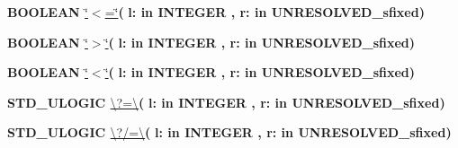 \begin{DoxyCompactItemize}
\item 
{\bfseries {\bfseries \textcolor{comment}{B\+O\+O\+L\+E\+A\+N}\textcolor{vhdlchar}{ }}} \hyperlink{class__fixed__pkg_a65b73a94d4fe541a941f431175b342b7}{\char`\"{}$<$=\char`\"{}}{\bfseries  ( }{\bfseries \textcolor{vhdlchar}{l\+: }\textcolor{stringliteral}{in }{\bfseries \textcolor{comment}{I\+N\+T\+E\+G\+E\+R}\textcolor{vhdlchar}{ }}}{\bfseries  , \textcolor{vhdlchar}{r\+: }\textcolor{stringliteral}{in }\textcolor{vhdlchar}{U\+N\+R\+E\+S\+O\+L\+V\+E\+D\+\_\+sfixed}}{\bfseries  )} 
\item 
{\bfseries {\bfseries \textcolor{comment}{B\+O\+O\+L\+E\+A\+N}\textcolor{vhdlchar}{ }}} \hyperlink{class__fixed__pkg_ac6c82329bf849852be997a3d0a737cf9}{\char`\"{}$>$\char`\"{}}{\bfseries  ( }{\bfseries \textcolor{vhdlchar}{l\+: }\textcolor{stringliteral}{in }{\bfseries \textcolor{comment}{I\+N\+T\+E\+G\+E\+R}\textcolor{vhdlchar}{ }}}{\bfseries  , \textcolor{vhdlchar}{r\+: }\textcolor{stringliteral}{in }\textcolor{vhdlchar}{U\+N\+R\+E\+S\+O\+L\+V\+E\+D\+\_\+sfixed}}{\bfseries  )} 
\item 
{\bfseries {\bfseries \textcolor{comment}{B\+O\+O\+L\+E\+A\+N}\textcolor{vhdlchar}{ }}} \hyperlink{class__fixed__pkg_a5d059cf3277e3585e4f3f076db10b273}{\char`\"{}$<$\char`\"{}}{\bfseries  ( }{\bfseries \textcolor{vhdlchar}{l\+: }\textcolor{stringliteral}{in }{\bfseries \textcolor{comment}{I\+N\+T\+E\+G\+E\+R}\textcolor{vhdlchar}{ }}}{\bfseries  , \textcolor{vhdlchar}{r\+: }\textcolor{stringliteral}{in }\textcolor{vhdlchar}{U\+N\+R\+E\+S\+O\+L\+V\+E\+D\+\_\+sfixed}}{\bfseries  )} 
\item 
{\bfseries {\bfseries \textcolor{comment}{S\+T\+D\+\_\+\+U\+L\+O\+G\+I\+C}\textcolor{vhdlchar}{ }}} \hyperlink{class__fixed__pkg_a69151531d87456d952c2073704fa1779}{\textbackslash{}?=\textbackslash{}}{\bfseries  ( }{\bfseries \textcolor{vhdlchar}{l\+: }\textcolor{stringliteral}{in }{\bfseries \textcolor{comment}{I\+N\+T\+E\+G\+E\+R}\textcolor{vhdlchar}{ }}}{\bfseries  , \textcolor{vhdlchar}{r\+: }\textcolor{stringliteral}{in }\textcolor{vhdlchar}{U\+N\+R\+E\+S\+O\+L\+V\+E\+D\+\_\+sfixed}}{\bfseries  )} 
\item 
{\bfseries {\bfseries \textcolor{comment}{S\+T\+D\+\_\+\+U\+L\+O\+G\+I\+C}\textcolor{vhdlchar}{ }}} \hyperlink{class__fixed__pkg_a172a73302b09f0d298b93ecda8c5e976}{\textbackslash{}?/=\textbackslash{}}{\bfseries  ( }{\bfseries \textcolor{vhdlchar}{l\+: }\textcolor{stringliteral}{in }{\bfseries \textcolor{comment}{I\+N\+T\+E\+G\+E\+R}\textcolor{vhdlchar}{ }}}{\bfseries  , \textcolor{vhdlchar}{r\+: }\textcolor{stringliteral}{in }\textcolor{vhdlchar}{U\+N\+R\+E\+S\+O\+L\+V\+E\+D\+\_\+sfixed}}{\bfseries  )} 

\end{DoxyCompactItemize}
